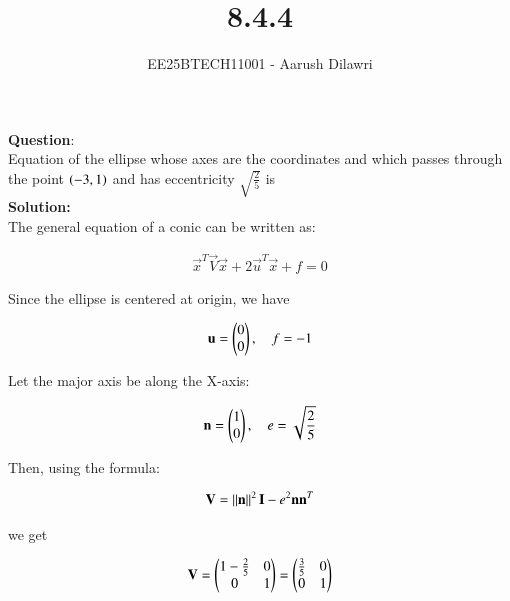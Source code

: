 \documentclass[journal]{IEEEtran}
\begin{document}

\vspace{3cm}

\title{8.4.4}
\author{EE25BTECH11001 - Aarush Dilawri}
{\let\newpage\relax\maketitle}

\renewcommand{\thefigure}{\theenumi}
\renewcommand{\thetable}{\theenumi}
\setlength{\intextsep}{10pt} %
\textbf{Question}:\\
Equation of the ellipse whose axes are the coordinates and which passes through the point $\left(-3,1\right)$ and has eccentricity $\sqrt{\frac{2}{5}}$ is\\

\textbf{Solution:} \\
The general equation of a conic can be written as:

\begin{align}
\vec{x}^T \vec{V} \vec{x} + 2 \vec{u}^T \vec{x} + f = 0
\end{align}

Since the ellipse is centered at origin, we have

\begin{align}
\mathbf{u} = \begin{pmatrix}0 \\ 0\end{pmatrix}, \quad f = -1
\end{align}

Let the major axis be along the X-axis:

\begin{align}
\mathbf{n} = \begin{pmatrix}1 \\ 0\end{pmatrix}, \quad e = \sqrt{\frac{2}{5}}
\end{align}

Then, using the formula:

\begin{align}
\mathbf{V} = \left\lVert\mathbf{n}\right\rVert^2 \mathbf{I} - e^2 \mathbf{n} \mathbf{n}^T
\end{align}

we get

\begin{align}
\mathbf{V} = \begin{pmatrix}1 - \frac{2}{5} & 0 \\ 0 & 1\end{pmatrix} = \begin{pmatrix}\frac{3}{5} & 0 \\ 0 & 1\end{pmatrix}
\end{align}
\end{document}
